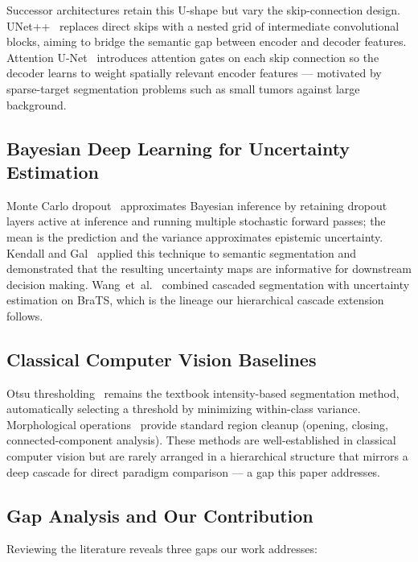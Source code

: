 \documentclass[conference]{IEEEtran}
\begin{document}
Successor architectures retain this U-shape but vary the skip-connection
design. UNet++~\cite{zhou2018unetpp} replaces direct skips with a nested
grid of intermediate convolutional blocks, aiming to bridge the semantic
gap between encoder and decoder features. Attention
U-Net~\cite{oktay2018attention} introduces attention gates on each skip
connection so the decoder learns to weight spatially relevant encoder
features --- motivated by sparse-target segmentation problems such as
small tumors against large background.

\subsection{Bayesian Deep Learning for Uncertainty Estimation}

Monte Carlo dropout~\cite{gal2016dropout} approximates Bayesian
inference by retaining dropout layers active at inference and running
multiple stochastic forward passes; the mean is the prediction and the
variance approximates epistemic uncertainty. Kendall and
Gal~\cite{kendall2017bayesian} applied this technique to semantic
segmentation and demonstrated that the resulting uncertainty maps are
informative for downstream decision making. Wang~et~al.~\cite{wang2019cascaded}
combined cascaded segmentation with uncertainty estimation on BraTS,
which is the lineage our hierarchical cascade extension follows.

\subsection{Classical Computer Vision Baselines}

Otsu thresholding~\cite{otsu1979threshold} remains the textbook
intensity-based segmentation method, automatically selecting a
threshold by minimizing within-class variance. Morphological
operations~\cite{soille2003morphology} provide standard region cleanup
(opening, closing, connected-component analysis). These methods are
well-established in classical computer vision but are rarely arranged
in a hierarchical structure that mirrors a deep cascade for direct
paradigm comparison --- a gap this paper addresses.

\subsection{Gap Analysis and Our Contribution}

Reviewing the literature reveals three gaps our work addresses:
\end{document}

